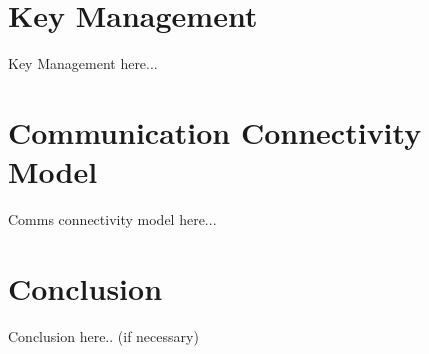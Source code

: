 \documentclass[a4paper,10pt]{article}
\begin{document}
\section{Key Management}
Key Management here...
\section{Communication Connectivity Model}
Comms connectivity model here...
\section{Conclusion}
Conclusion here.. (if necessary)

\end{document}
